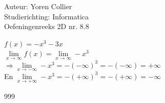 \documentclass[a4paper]{article}
\newcommand{\adR}{\Rightarrow} %
\newcommand{\Lh}{\left(} %
\newcommand{\Rh}{\right)}
\newcommand{\pnR}{\rightarrow} %
\newcommand{\limiet}{\lim\limits_}
\begin{document}
\noindent \large Auteur: Yoren Collier \\
\noindent \large Studierichting: Informatica\\
\noindent \large Oefeningenreeks 2D nr. 8.8\\

\medskip

\normalsize

$f(x) = -x^3 - 3x$\\

$\limiet{x \pnR \infty} f(x) = \limiet{x \pnR \infty} -x^3$\\

$\adR \limiet{x \pnR -\infty} -x^3 = -\Lh -\infty \Rh ^3 = -\Lh -\infty \Rh = +\infty$\\

En $\limiet{x \pnR +\infty} -x^3 = -\Lh +\infty \Rh ^3 = -\Lh +\infty \Rh = -\infty$

\begin{thebibliography}{999}
\end{thebibliography}
\end{document}

